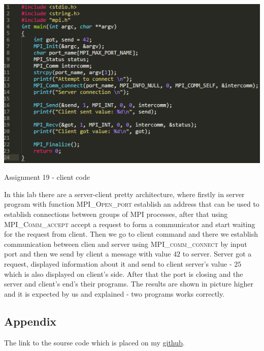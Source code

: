 \documentclass[%
12pt, %
final, %
oneside, %
onecolumn, %
centertags]{article} %
\theoremstyle{plain}
\theoremstyle{definition}
\theoremstyle{remark}
\begin{document}
\begin{center}
\includegraphics[scale=1.1]{19.client.code.png}

Assignment 19 - client code
\end{center}

In this lab there are a server-client pretty architecture, where firstly in server program with function \textsc{MPI\_Open\_port} establish an address that can be used to establish connections between groups of MPI processes, after that using \textsc{MPI\_Comm\_accept} accept a request to form a communicator and start waiting for the request from client. Then we go to client command and there we establish communication between clien and server using \textsc{MPI\_comm\_connect} by input port and then we send by client a message with value $42$ to server. Server got a request, displayed information about it and send to client server's value - $25$ which is also displayed on client's side. After that the port is closing and the server and client's end's their programs. The results are shown in picture higher and it is expected by us and explained - two programs works correctly.


\subsection{Appendix}
 
The link to the sourse code which is placed on my \href{https://github.com/aptmess/parallel_algorithms}{github}.
\end{document}

